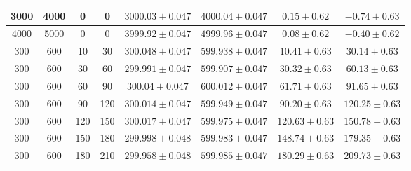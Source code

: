 \documentclass{cmspaper}
\begin{document}
\begin{table} [th]
\begin{center}
\begin{tabular}{|c|c|c|c|c|c|c|c|}
3000& 4000& 0 &    0 &$ 3000.03\pm 0.047$&$4000.04 \pm 0.047$&$0.15  \pm  0.62 $&$ -0.74 \pm  0.63$\\ \hline
4000& 5000& 0 &    0 &$ 3999.92\pm 0.047$&$4999.96 \pm 0.047$&$0.08  \pm  0.62 $&$ -0.40 \pm   0.62$\\ \hline
300 & 600 & 10&    30&$ 300.048\pm 0.047$&$599.938 \pm 0.047$&$10.41 \pm  0.63 $&$ 30.14 \pm   0.63$\\ \hline
300 & 600 & 30&    60&$ 299.991\pm 0.047$&$599.907 \pm 0.047$&$30.32 \pm  0.63 $&$ 60.13 \pm   0.63$\\ \hline
300 & 600 & 60&    90&$ 300.04 \pm 0.047$&$600.012 \pm 0.047$&$61.71 \pm  0.63 $&$ 91.65 \pm   0.63$\\ \hline
300 & 600 & 90&   120&$ 300.014\pm 0.047$&$599.949 \pm 0.047$&$90.20 \pm  0.63 $&$ 120.25 \pm  0.63$\\ \hline
300 & 600 &120&   150&$ 300.017\pm 0.047$&$599.975 \pm 0.047$&$120.63\pm  0.63 $&$ 150.78 \pm  0.63$\\ \hline
300 & 600 &150&   180&$ 299.998\pm 0.048$&$599.983 \pm 0.047$&$148.74 \pm 0.63 $&$ 179.35\pm   0.63$\\ \hline
300 & 600 &180&   210&$ 299.958\pm 0.048$&$599.985 \pm 0.047$&$180.29\pm  0.63 $&$ 209.73 \pm  0.63$\\ \hline
\end{tabular}


\end{center}
\end{table}


\end{document}
